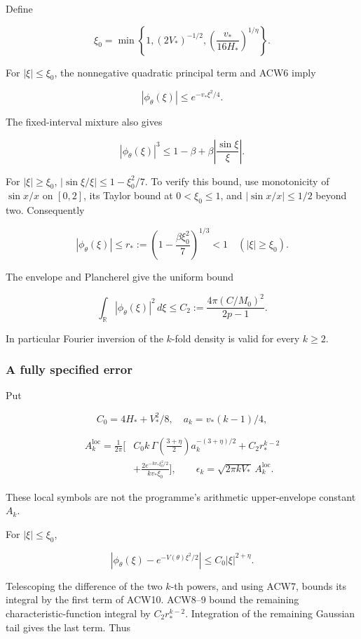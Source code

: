 \documentclass[11pt,a4paper]{article}
\begin{document}
Define

\[
\xi_0=\min\left\{1,(2V_*)^{-1/2},
\left(\frac{v_*}{16H_*}\right)^{1/\eta}\right\}.
\]

For \(|\xi|\le\xi_0\), the nonnegative quadratic principal term and ACW6 imply

\[
|\phi_\theta(\xi)|\le e^{-v_*\xi^2/4}.
\tag{ACW7}
\]

The fixed-interval mixture also gives

\[
|\phi_\theta(\xi)|^3\le1-\beta+\beta\left|\frac{\sin\xi}{\xi}\right|.
\]

For \(|\xi|\ge\xi_0\),
\(|\sin\xi/\xi|\le1-\xi_0^2/7\). To verify this bound, use monotonicity of \(\sin x/x\) on \([0,2]\), its Taylor bound at \(0<\xi_0\le1\), and \(|\sin x/x|\le1/2\) beyond two. Consequently

\[
|\phi_\theta(\xi)|\le r_*
:=\left(1-\frac{\beta\xi_0^2}{7}\right)^{1/3}<1
\quad(|\xi|\ge\xi_0).
\tag{ACW8}
\]

The envelope and Plancherel give the uniform bound

\[
\int_{\mathbb R}|\phi_\theta(\xi)|^2\,d\xi
\le C_2:=\frac{4\pi(C/M_0)^2}{2p-1}.
\tag{ACW9}
\]

In particular Fourier inversion of the \(k\)-fold density is valid for every \(k\ge2\).

\subsubsection{A fully specified error}\label{acw:a-fully-specified-error}

Put

\[
C_0=4H_*+V_*^2/8,\quad a_k=v_*(k-1)/4,
\]

\[
\begin{aligned}
A_k^{\mathrm{loc}}=\frac1{2\pi}\bigg[
&C_0 k\,\Gamma\!\left(\frac{3+\eta}{2}\right)
 a_k^{-(3+\eta)/2}
+C_2 r_*^{k-2}\\
&+\frac{2e^{-kv_*\xi_0^2/2}}{kv_*\xi_0}
\bigg],\qquad
\epsilon_k=\sqrt{2\pi kV_*}\,A_k^{\mathrm{loc}}.
\end{aligned}
\tag{ACW10}
\]

These local symbols are not the programme's arithmetic upper-envelope constant \(A_k\).

For \(|\xi|\le\xi_0\),

\[
|\phi_\theta(\xi)-e^{-V(\theta)\xi^2/2}|
\le C_0|\xi|^{2+\eta}.
\]

Telescoping the difference of the two \(k\)-th powers, and using ACW7, bounds its integral by the first term of ACW10. ACW8--9 bound the remaining characteristic-function integral by \(C_2r_*^{k-2}\). Integration of the remaining Gaussian tail gives the last term. Thus
\end{document}
